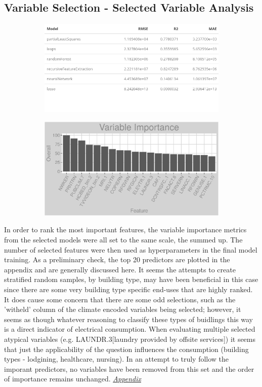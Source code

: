 \subsection{Variable Selection - Selected Variable Analysis}
\begin{figure}[h]
\begin{subfigure}{1\textwidth}
\centering
\includegraphics[width=.6\textwidth, height=0.2\textheight]{Images/electricity_fe_summary.png}
\end{subfigure}
\begin{subfigure}{1\textwidth}
\centering
\includegraphics[width=.99\textwidth, height=0.3\textheight]{Images/electricity_all_vars.png}
\end{subfigure}
\end{figure}
In order to rank the most important features, the variable importance metrics from the selected models were all set to the same scale, the summed up.  The number of selected features were then used as hyperparameters in the final model training.  As a preliminary check, the top 20 predictors are plotted in the appendix and are generally discussed here.  It seems the attempts to create stratified random samples, by building type, may have been beneficial in this case since there are some very building type specific end-uses that are highly ranked.  It does cause some concern that there are some odd selections, such as the 'witheld' column of the climate encoded variables being selected; however, it seems as though whatever reasoning to classify these types of buidlings this way is a direct indicator of electrical consumption.  When evaluating multiple selected atypical variables (e.g. LAUNDR.3[laundry provided by offsite services]) it seems that just the applicability of the question influences the consumption (building types - lodgining, healthcare, nursing).  In an attempt to truly follow the imporant predictors, no variables have been removed from this set and the order of importance remains unchanged.  \textit{\hyperref[appendix:electricity:sva]{Appendix}}